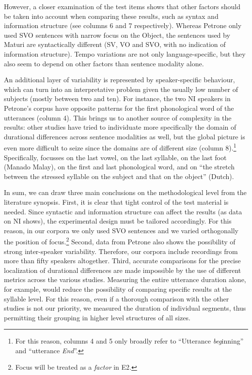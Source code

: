 However, a closer examination of the test items shows that other factors should be taken into account when comparing these results, such as syntax and information structure (see columns 6 and 7 respectively). Whereas Petrone only used SVO sentences with narrow focus on the Object, the sentences used by Maturi are syntactically different (SV, VO and SVO, with no indication of information structure). Tempo variations are not only language-specific, but they also seem to depend on other factors than sentence modality alone. 

An additional layer of variability is represented by speaker-specific behaviour, which can turn into an interpretative problem given the usually low number of subjects (mostly between two and ten). For instance, the two NI speakers in Petrone's corpus have opposite patterns for the first phonological word of the utterances (column 4). This brings us to another source of complexity in the results: other studies have tried to individuate more specifically the domain of durational differences across sentence modalities as well, but the global picture is even more difficult to seize since the domains are of different size (column 8).\footnote{For this reason, columns 4 and 5 only broadly refer to ``Utterance \textit{beg}inning'' and ``utterance \textit{End}''.} Specifically, \citet{smith2002prosodic} focusses on the last vowel, \citet{ryalls1994effects} on the last syllable, \citet{vanheuven2005speech} on the last foot (Manado Malay), \citet{petrone2008role} on the first and last phonological word, and \citet{vanheuven2005speech} on ``the stretch between the stressed syllable on the subject and that on the object'' (Dutch). 

In sum, we can draw three main conclusions on the methodological level from the literature synopsis. First, it is clear that tight control of the test material is needed. Since syntactic and information structure can affect the results (as data on NI shows), the experimental design must be tailored accordingly. For this reason, in our corpora we only used SVO sentences and we varied orthogonally the position of focus.\footnote{Focus will be treated as a \textit{factor} in E2.} Second, data from Petrone also shows the possibility of strong inter-speaker variability. Therefore, our corpora include recordings from more than fifty speakers altogether. Third, accurate comparisons for the precise localization of durational differences are made impossible by the use of different metrics across the various studies. Measuring the entire utterance duration alone, for example, would reduce the possibility of comparing specific results at the syllable level. For this reason, even if a thorough comparison with the other studies is not our priority, we measured the duration of individual segments, thus permitting their grouping in higher level structures of all sizes.


